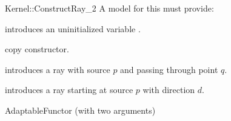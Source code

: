 \begin{ccRefFunctionObjectConcept}{Kernel::ConstructRay_2}
A model for this must provide:



\ccHidden {}
             {introduces an uninitialized variable .}

\ccHidden {}
            {copy constructor.}

            {introduces a ray  
             with source $p$ and passing through point $q$.}

            {introduces a ray  starting at source $p$ with 
             direction $d$.}

\ccRefines
AdaptableFunctor (with two arguments)

\ccSeeAlso
{}\\

\end{ccRefFunctionObjectConcept}
